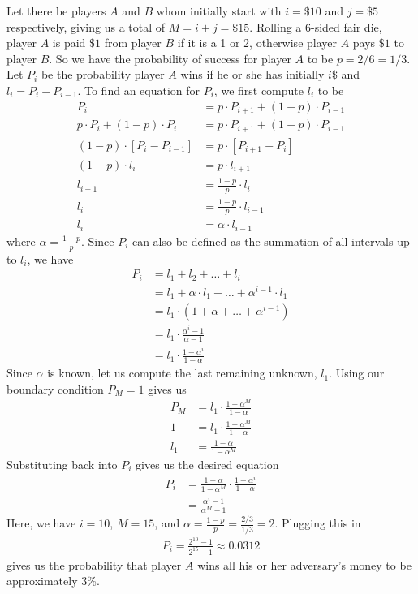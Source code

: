\documentclass[11pt, oneside]{article}   	%
\begin{document}
Let there be players $A$ and $B$ whom initially start with $i=\$10$ and $j=\$5$ respectively, giving us a total of $M=i+j = \$15$. Rolling a 6-sided fair die, player $A$ is paid $\$1$ from player $B$ if it is a 1 or 2, otherwise player $A$ pays $\$1$ to player $B$. So we have the probability of success for player $A$ to be $p=2/6 = 1/3$. Let $P_i$ be the probability player $A$ wins if  he or she has initially $i\$$ and $l_i = P_i - P_{i-1}$. To find an equation for $P_i$, we first compute $l_i$ to be
\begin{align*}
	P_i & = p \cdot P_{i+1} + (1-p) \cdot P_{i-1} \\
	p \cdot P_{i} + (1-p) \cdot P_{i} & = p \cdot P_{i+1} + (1-p) \cdot P_{i-1} \\
	(1-p) \cdot [P_i - P_{i-1}] & = p \cdot [P_{i+1} - P_i] \\
	(1-p) \cdot l_i & = p \cdot l_{i+1} \\
	l_{i+1} & = \frac{1-p}{p} \cdot l_{i} \\
	l_i & = \frac{1-p}{p} \cdot l_{i-1} \\
	l_i & = \alpha \cdot l_{i-1}
\end{align*}
where $\alpha = \frac{1-p}{p}$. Since $P_i$ can also be defined as the summation of all intervals up to $l_i$, we have
\begin{align*}
	P_i & = l_1 + l_2 + \ldots + l_i \\
	& = l_1 + \alpha \cdot l_1 + \ldots + \alpha^{i-1} \cdot l_1 \\
	& = l_1 \cdot (1 + \alpha + \ldots + \alpha^{i-1}) \\
	& = l_1 \cdot \frac{\alpha^i - 1}{\alpha-1} \\
	& = l_1 \cdot \frac{1-\alpha^i}{1-\alpha}
\end{align*}
Since $\alpha$ is known, let us compute the last remaining unknown, $l_1$. Using our boundary condition $P_M =1$ gives us
\begin{align*}
	P_M & = l_1 \cdot  \frac{1-\alpha^M}{1-\alpha} \\
	1 & = l_1 \cdot  \frac{1-\alpha^M}{1-\alpha} \\
	l_1 & = \frac{1-\alpha}{1-\alpha^M}
\end{align*}
Substituting back into $P_i$ gives us the desired equation
\begin{align*}
	P_i & = \frac{1-\alpha}{1-\alpha^M} \cdot \frac{1-\alpha^i}{1-\alpha} \\
	& = \frac{\alpha^i-1}{\alpha^M-1}
\end{align*}
Here, we have $i=10$, $M=15$, and $\alpha = \frac{1-p}{p} = \frac{2/3}{1/3} = 2$. Plugging this in
\begin{align*}
	P_i = \frac{2^{10}-1}{2^{15}-1} \approx 0.0312
\end{align*}
gives us the probability that player $A$ wins all his or her adversary's money to be approximately 3\%.
\end{document}
